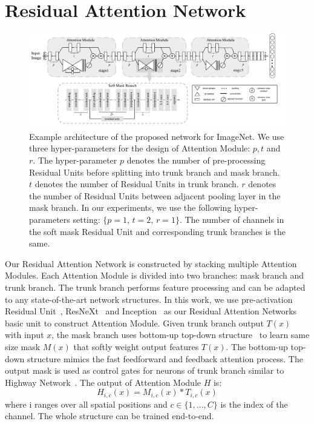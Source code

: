 \documentclass[10pt,twocolumn,letterpaper]{article}
\begin{document}
\section{Residual Attention Network}

\begin{figure}[t]
\setlength{\abovecaptionskip}{0pt}

\begin{center}
  \includegraphics[width=1.0\linewidth]{whole_net.pdf}
\end{center}
   \caption{Example architecture of the proposed network for ImageNet. We use three hyper-parameters for the design of Attention Module: $p,t$ and $r$. The hyper-parameter $p$ denotes the number of pre-processing Residual Units before splitting into trunk branch and mask branch. $t$ denotes the number of Residual Units in trunk branch. $r$ denotes the number of Residual Units between adjacent pooling layer in the mask branch. In our experiments, we use the following hyper-parameters setting: $\{p=1$, $t=2$, $r=1\}$. The number of channels in the soft mask Residual Unit and corresponding trunk branches is the same.}

\label{fig:Attention}
\end{figure}

Our Residual Attention Network is constructed by stacking multiple Attention Modules. Each Attention Module is divided into two branches: mask branch and trunk branch. The trunk branch performs feature processing and can be adapted to any state-of-the-art network structures.
%
In this work, we use pre-activation Residual Unit~\cite{he2016identity}, ResNeXt~\cite{resnext} and Inception~\cite{inception} as our Residual Attention Networks basic unit to construct Attention Module. Given trunk branch output $T(x)$ with input $x$, the mask branch uses bottom-up top-down structure~\cite{long2015fully, noh2015learning, badrinarayanan2015segnet, newell2016stacked} to learn same size mask $M(x)$ that softly weight output features $T(x)$. The bottom-up top-down structure mimics the fast feedforward and feedback attention process. The output mask is used as control gates for neurons of trunk branch similar to Highway Network~\cite{srivastava2015training}. The output of Attention Module $H$ is:
\begin{equation}
H_{i,c}(x)=M_{i,c}(x)*T_{i,c}(x)
\end{equation}
where i ranges over all spatial positions and $c\in \{1,...,C\}$ is the index of the channel. The whole structure can be trained end-to-end.
\end{document}
